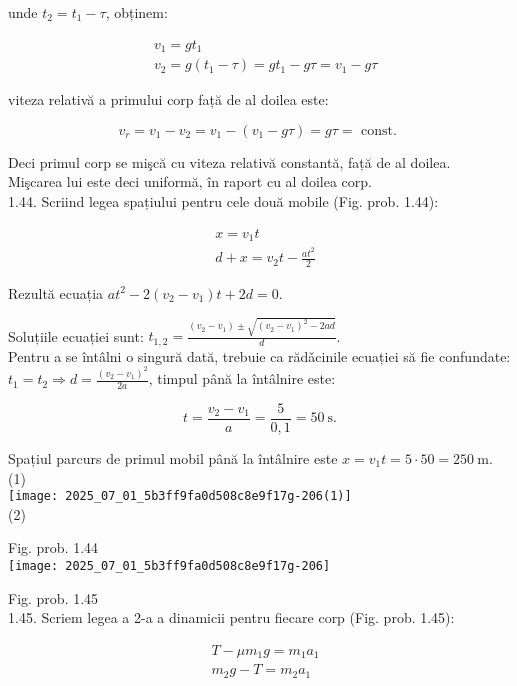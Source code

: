 unde $t_{2}=t_{1}-\tau$, obținem:

$$
\begin{aligned}
& v_{1}=g t_{1} \\
& v_{2}=g\left(t_{1}-\tau\right)=g t_{1}-g \tau=v_{1}-g \tau
\end{aligned}
$$

viteza relativă a primului corp față de al doilea este:

$$
v_{r}=v_{1}-v_{2}=v_{1}-\left(v_{1}-g \tau\right)=g \tau=\text { const. }
$$

Deci primul corp se mişcă cu viteza relativă constantă, față de al doilea.\\
Mişcarea lui este deci uniformă, în raport cu al doilea corp.\\
1.44. Scriind legea spațiului pentru cele două mobile (Fig. prob. 1.44):

$$
\begin{aligned}
& x=v_{1} t \\
& d+x=v_{2} t-\frac{a t^{2}}{2}
\end{aligned}
$$

Rezultă ecuația $a t^{2}-2\left(v_{2}-v_{1}\right) t+2 d=0$.

Soluțiile ecuației sunt: $t_{1,2}=\frac{\left(v_{2}-v_{1}\right) \pm \sqrt{\left(v_{2}-v_{1}\right)^{2}-2 a d}}{d}$.\\
Pentru a se întâlni o singură dată, trebuie ca rădǎcinile ecuației să fie confundate: $t_{1}=t_{2} \Rightarrow d=\frac{\left(v_{2}-v_{1}\right)^{2}}{2 a}$, timpul până la întâlnire este:

$$
t=\frac{v_{2}-v_{1}}{a}=\frac{5}{0,1}=50 \mathrm{~s} .
$$

Spațiul parcurs de primul mobil până la întâlnire este $x=v_{1} t=5 \cdot 50=250 \mathrm{~m}$.\\
(1)\\
\texttt{[image: 2025\_07\_01\_5b3ff9fa0d508c8e9f17g-206(1)]}\\
(2)

Fig. prob. 1.44\\
\texttt{[image: 2025\_07\_01\_5b3ff9fa0d508c8e9f17g-206]}

Fig. prob. 1.45\\
1.45. Scriem legea a 2-a a dinamicii pentru fiecare corp (Fig. prob. 1.45):

$$
\begin{aligned}
& T-\mu m_{1} g=m_{1} a_{1} \\
& m_{2} g-T=m_{2} a_{1}
\end{aligned}
$$

